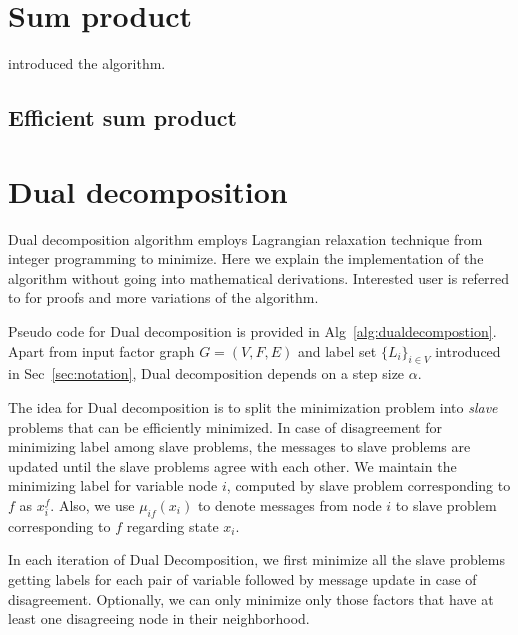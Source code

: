 \documentclass[letterpaper, 10 pt, conference]{ieeeconf} %
\begin{document}
\section{Sum product}
\cite{kschischang2001factor} introduced the algorithm.
\subsection{Efficient sum product}
\section{Dual decomposition}
\newcommand{\msg}[3]{\mu_{#1#2}(#3)}
\newcommand{\assign}{\leftarrow}
\newcommand{\Sx}{L_i}
Dual decomposition algorithm employs Lagrangian relaxation technique from integer programming to minimize. Here we explain the implementation of the algorithm without going into mathematical derivations. Interested user is referred to \cite{sontag2011introduction,jojic2010accelerated,komodakis2009beyond} for proofs and more variations of the algorithm. 

Pseudo code for Dual decomposition is provided in Alg~\ref{alg:dualdecompostion}. Apart from input factor graph $G = (V, F, E)$ and label set $\{\Sx\}_{i \in V}$ introduced in Sec~\ref{sec:notation}, Dual decomposition depends on a step size $\alpha$.

The idea for Dual decomposition is to split the minimization problem into \emph{slave} problems that can be efficiently minimized. In case of disagreement for minimizing label among slave problems, the messages to slave problems are updated until the slave problems agree with each other. We maintain the minimizing label for variable node $i$, computed by slave problem corresponding to $f$ as $x^f_i$. Also, we use $\msg{i}{f}{x_i}$ to denote messages from node $i$ to slave problem corresponding to $f$ regarding state $x_i$.

In each iteration of Dual Decomposition, we first minimize all the slave problems getting labels for each pair of variable followed by message update in case of disagreement. Optionally, we can only minimize only those factors that have at least one disagreeing node in their neighborhood.
\end{document}
